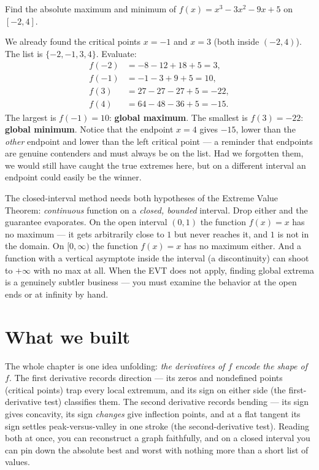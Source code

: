 \begin{example}\label{ch16:ex-closed}
Find the absolute maximum and minimum of $f(x)=x^3-3x^2-9x+5$ on $[-2,4]$.

\smallskip
We already found the critical points $x=-1$ and $x=3$ (both inside $(-2,4)$). The
list is $\{-2,-1,3,4\}$. Evaluate:
\[
\begin{aligned}
f(-2)&=-8-12+18+5=3,\\
f(-1)&=-1-3+9+5=10,\\
f(3)&=27-27-27+5=-22,\\
f(4)&=64-48-36+5=-15.
\end{aligned}
\]
The largest is $f(-1)=10$: \textbf{global maximum}. The smallest is $f(3)=-22$:
\textbf{global minimum}. Notice that the endpoint $x=4$ gives $-15$, lower than the
\emph{other} endpoint and lower than the left critical point --- a reminder that
endpoints are genuine contenders and must always be on the list. Had we forgotten
them, we would still have caught the true extremes here, but on a different interval
an endpoint could easily be the winner.
\end{example}

\begin{trapbox}
The closed-interval method needs both hypotheses of the Extreme Value Theorem:
\emph{continuous} function on a \emph{closed, bounded} interval. Drop either and the
guarantee evaporates. On the open interval $(0,1)$ the function $f(x)=x$ has no
maximum --- it gets arbitrarily close to $1$ but never reaches it, and $1$ is not in
the domain. On $[0,\infty)$ the function $f(x)=x$ has no maximum either. And a
function with a vertical asymptote inside the interval (a discontinuity) can shoot
to $+\infty$ with no max at all. When the EVT does not apply, finding global
extrema is a genuinely subtler business --- you must examine the behavior at the
open ends or at infinity by hand.
\end{trapbox}

\section{What we built}

The whole chapter is one idea unfolding: \emph{the derivatives of $f$ encode the
shape of $f$}. The first derivative records direction --- its zeros and
nondefined points (critical points) trap every local extremum, and its sign on
either side (the first-derivative test) classifies them. The second derivative
records bending --- its sign gives concavity, its sign \emph{changes} give
inflection points, and at a flat tangent its sign settles peak-versus-valley in
one stroke (the second-derivative test). Reading both at once, you can reconstruct
a graph faithfully, and on a closed interval you can pin down the absolute best and
worst with nothing more than a short list of values.

